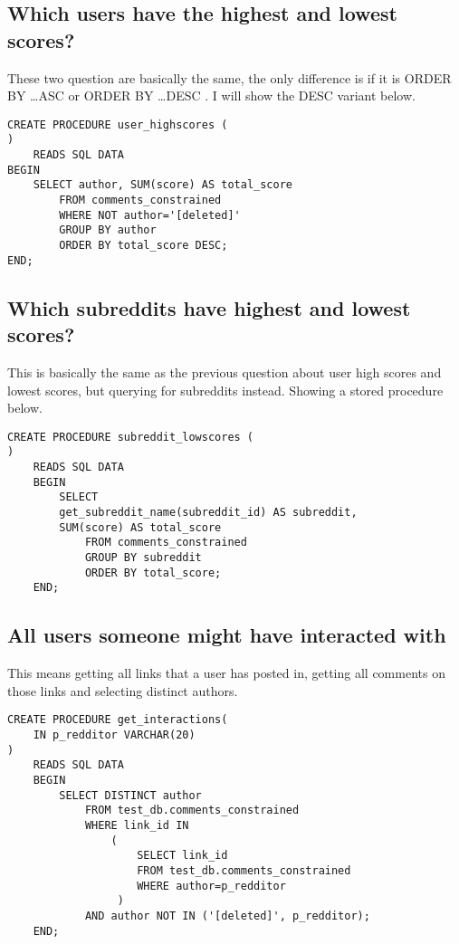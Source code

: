     \subsection{Which users have the highest and lowest scores?} \label{subsec:user-high-low-scores}

    These two question are basically the same, the only difference is if it is ORDER BY \ldots ASC or ORDER BY \ldots DESC .
    I will show the DESC variant below.

    \begin{verbatim}
CREATE PROCEDURE user_highscores (
)
    READS SQL DATA
BEGIN
    SELECT author, SUM(score) AS total_score
        FROM comments_constrained
        WHERE NOT author='[deleted]'
        GROUP BY author
        ORDER BY total_score DESC;
END;
    \end{verbatim}

    \subsection{Which subreddits have highest and lowest scores?} \label{subsec:subreddit-high-low-scores}
    This is basically the same as the previous question about user high scores and lowest scores, but querying for subreddits instead.
    Showing a stored procedure below.

    \begin{verbatim}
CREATE PROCEDURE subreddit_lowscores (
)
    READS SQL DATA
    BEGIN
        SELECT
        get_subreddit_name(subreddit_id) AS subreddit,
        SUM(score) AS total_score
            FROM comments_constrained
            GROUP BY subreddit
            ORDER BY total_score;
    END;
    \end{verbatim}

    \subsection{All users someone might have interacted with} \label{subsec:potential-interactions}

This means getting all links that a user has posted in, getting all comments on those links and selecting distinct authors.

    \begin{verbatim}
CREATE PROCEDURE get_interactions(
    IN p_redditor VARCHAR(20)
)
    READS SQL DATA
    BEGIN
        SELECT DISTINCT author
            FROM test_db.comments_constrained
            WHERE link_id IN
                (
                    SELECT link_id
                    FROM test_db.comments_constrained
                    WHERE author=p_redditor
                 )
            AND author NOT IN ('[deleted]', p_redditor);
    END;
    \end{verbatim}

